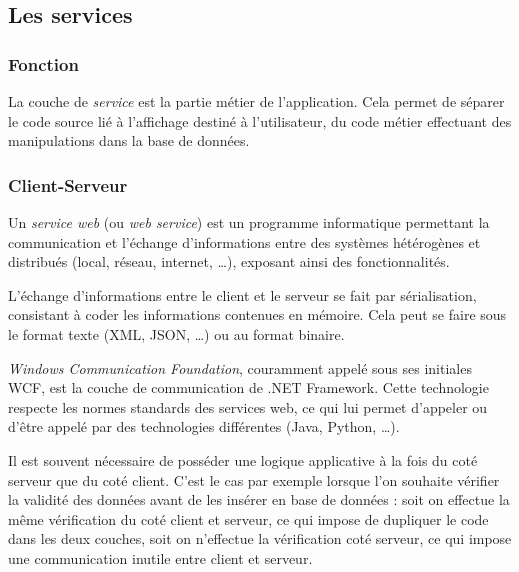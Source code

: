 
\subsection{Les services}


\subsubsection{Fonction}

La couche de \textit{service} est la partie métier de l'application. Cela permet de séparer le code source lié à l'affichage destiné à l'utilisateur, du code métier effectuant des manipulations dans la base de données.


\subsubsection{Client-Serveur}


Un \textit{service web} (ou \textit{web service}) est un programme informatique permettant la communication et l'échange d'informations entre des systèmes hétérogènes et distribués (local, réseau, internet, \ldots), exposant ainsi des fonctionnalités.

L'échange d'informations entre le client et le serveur se fait par sérialisation, consistant à coder les informations contenues en mémoire. Cela peut se faire sous le format texte (XML, JSON, \ldots) ou au format binaire.



\textit{Windows Communication Foundation}, couramment appelé sous ses initiales WCF, est la couche de communication de .NET Framework. Cette technologie respecte les normes standards des services web, ce qui lui permet d'appeler ou d'être appelé par des technologies différentes (Java, Python, \ldots).



Il est souvent nécessaire de posséder une logique applicative à la fois du coté serveur que du coté client. C'est le cas par exemple lorsque l'on souhaite vérifier la validité des données avant de les insérer en base de données : soit on effectue la même vérification du coté client et serveur, ce qui impose de dupliquer le code dans les deux couches, soit on n'effectue la vérification coté serveur, ce qui impose une communication inutile entre client et serveur.

